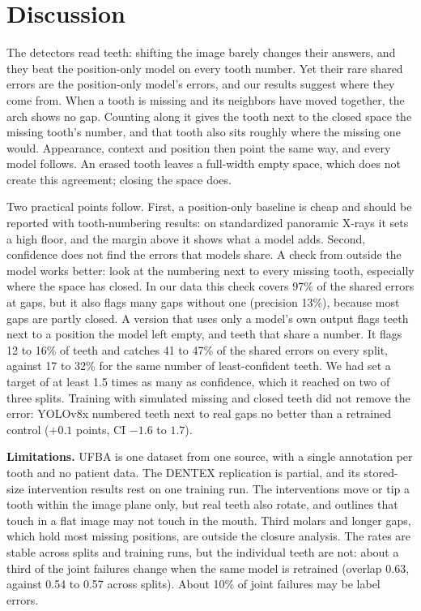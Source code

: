 \documentclass[runningheads]{llncs}
\begin{document}
\section{Discussion}

The detectors read teeth: shifting the image barely changes their answers, and they beat the position-only model on every tooth number. Yet their rare
shared errors are the position-only model's errors, and our results suggest
where they come from. When a tooth is missing and its neighbors have moved
together, the arch shows no gap. Counting along it gives the tooth next to
the closed space the missing tooth's number, and that tooth also sits roughly
where the missing one would. Appearance, context and position then point the
same way, and every model follows. An erased tooth leaves a full-width empty
space, which does not create this agreement; closing the space does.

Two practical points follow. First, a position-only baseline is cheap and
should be reported with tooth-numbering results: on standardized panoramic
X-rays it sets a high floor, and the margin above it shows what a model adds.
Second, confidence does not find the errors that models share. A check from
outside the model works better: look at the numbering next to every missing
tooth, especially where the space has closed. In our data this check covers
97\% of the shared errors at gaps, but it also flags many gaps without one
(precision 13\%), because most gaps are partly closed. A version that uses
only a model's own output flags teeth next to a position the model left
empty, and teeth that share a number. It flags 12 to 16\% of teeth and
catches 41 to 47\% of the shared errors on every split, against 17 to 32\%
for the same number of least-confident teeth. We had set a target of at
least 1.5 times as many as confidence, which it reached on two of three
splits. Training with simulated missing and closed teeth did not remove the
error: YOLOv8x numbered teeth next to real gaps no better than a retrained
control ($+0.1$ points, CI $-1.6$ to $1.7$).

\textbf{Limitations.} UFBA is one dataset from one source, with a single
annotation per tooth and no patient data. The DENTEX replication is partial,
and its stored-size intervention results rest on one training run. The
interventions move or tip a tooth within the image plane only, but real
teeth also rotate, and outlines that touch in a flat image may not touch in
the mouth. Third molars and longer gaps, which hold most missing positions,
are outside the closure analysis. The rates are stable across splits and
training runs, but the individual teeth are not: about a third of the joint
failures change when the same model is retrained (overlap 0.63, against 0.54
to 0.57 across splits). About 10\% of joint failures may be label errors.
\end{document}
